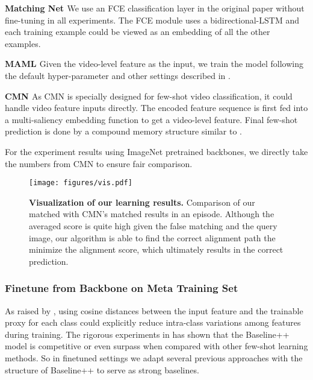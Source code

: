 \documentclass[10pt,twocolumn,letterpaper]{article}
\begin{document}
\noindent
\textbf{Matching Net \cite{vinyals2016matching}} We use an FCE classification layer in the original paper without fine-tuning in all experiments. The FCE module uses a bidirectional-LSTM and each training example could be viewed as an embedding of all the other examples.

\noindent
\textbf{MAML \cite{finn2017model}} Given the video-level feature as the input, we train the model following the default hyper-parameter and other settings described in \cite{finn2017model}.


\noindent
\textbf{CMN \cite{zhu2018compound}} As CMN is specially designed for few-shot video classification, it could handle video feature inputs directly. The encoded feature sequence is first fed into a multi-saliency embedding function to get a video-level feature. Final few-shot prediction is done by a compound memory structure similar to \cite{kaiser2017learning}.

For the experiment results using ImageNet pretrained backbones, we directly take the numbers from CMN \cite{zhu2018compound} to ensure fair comparison.

\begin{figure*}[ht]
    \centering
    \texttt{[image: figures/vis.pdf]}
    \caption{\textbf{Visualization of our learning results.} Comparison of our matched with CMN's matched results in an episode. Although the averaged score is quite high given the false matching and the query image, our algorithm is able to find the correct alignment path the minimize the alignment score, which ultimately results in the correct prediction.}
    \label{fig:vis}
    \vspace{-0.5cm}
\end{figure*}

\subsubsection{Finetune from Backbone on Meta Training Set}

As raised by \cite{chen19closerfewshot,gidaris2018dynamic,qi2018low}, using cosine distances between the input feature and the trainable proxy for each class could explicitly reduce intra-class variations among features during training. The rigorous experiments in \cite{chen19closerfewshot} has shown that the Baseline++ model is competitive or even surpass when compared with other few-shot learning methods. So in finetuned settings we adapt several previous approaches with the structure of Baseline++ to serve as strong baselines.
\end{document}

